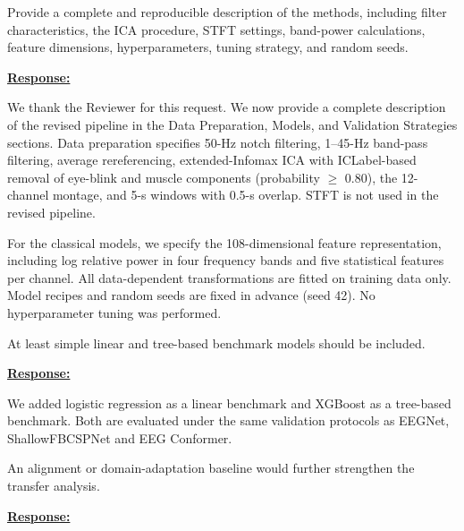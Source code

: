 \documentclass{article}
\begin{document}
\vspace{0.3cm}


\begin{cmt}{}{}

Provide a complete and reproducible description of the methods, including filter
characteristics, the ICA procedure, STFT settings, band-power calculations,
feature dimensions, hyperparameters, tuning strategy, and random seeds.

\end{cmt}
\vspace{0.1cm}
\noindent
\underline{\textbf{Response:}}
\vspace{0.2cm}

We thank the Reviewer for this request. We now provide a complete description
of the revised pipeline in the Data Preparation, Models, and Validation
Strategies sections. Data preparation specifies 50-Hz notch filtering,
1--45-Hz band-pass filtering, average rereferencing, extended-Infomax ICA with
ICLabel-based removal of eye-blink and muscle components (probability $\geq$
0.80), the 12-channel montage, and 5-s windows with 0.5-s overlap. STFT is not
used in the revised pipeline.

For the classical models, we specify the 108-dimensional feature
representation, including log relative power in four frequency bands and five
statistical features per channel. All data-dependent transformations are fitted
on training data only. Model recipes and random seeds are fixed in advance
(seed 42). No hyperparameter tuning was performed.

\vspace{0.3cm}


\begin{cmt}{}{}

At least simple linear and tree-based benchmark models should be included.

\end{cmt}
\vspace{0.1cm}
\noindent
\underline{\textbf{Response:}}
\vspace{0.2cm}

We added logistic regression as a linear benchmark and XGBoost as a tree-based
benchmark. Both are evaluated under the same validation protocols as EEGNet,
ShallowFBCSPNet and EEG Conformer.

\vspace{0.3cm}


\begin{cmt}{}{}

An alignment or domain-adaptation baseline would further strengthen the transfer
analysis.

\end{cmt}
\vspace{0.1cm}
\noindent
\underline{\textbf{Response:}}
\vspace{0.2cm}
\end{document}
